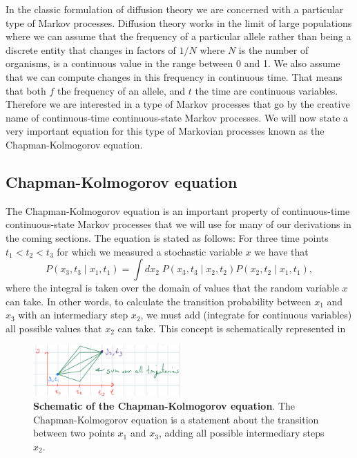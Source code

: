 In the classic formulation of diffusion theory we are concerned with a
particular type of Markov processes. Diffusion theory works in the limit of
large populations where we can assume that the frequency of a particular allele
rather than being a discrete entity that changes in factors of $1 / N$ where
$N$ is the number of organisms, is a continuous value in the range between 0
and 1. We also assume that we can compute changes in this frequency in
continuous time. That means that both $f$ the frequency of an allele, and $t$
the time are continuous variables. Therefore we are interested in a type of
Markov processes that go by the creative name of continuous-time
continuous-state Markov processes. We will now state a very important equation
for this type of Markovian processes known as the Chapman-Kolmogorov equation.

\subsection{Chapman-Kolmogorov equation} \label{sec_chapman_kolmogorov}

The Chapman-Kolmogorov equation is an important property of continuous-time
continuous-state Markov processes that we will use for many of our derivations
in the coming sections. The equation is stated as follows: For three time points
$t_1 < t_2 < t_3$ for which we measured a stochastic variable $x$ we have that
\begin{equation}
  P(x_3, t_3 \mid x_1, t_1) = \int dx_2\; P(x_3, t_3 \mid x_2, t_2)
                                          P(x_2, t_2 \mid x_1, t_1),
\end{equation}
where the integral is taken over the domain of values that the random variable
$x$ can take. In other words, to calculate the transition probability between
$x_1$ and $x_3$ with an intermediary step $x_2$, we must add (integrate for
continuous variables) all possible values that $x_2$ can take. This concept is
schematically represented in 

\begin{figure}[h!]
	\centering \includegraphics[width=0.5\textwidth]
  {./fig/chapter_prob/01_00003.png}
	\caption{\textbf{Schematic of the Chapman-Kolmogorov equation}. The
  Chapman-Kolmogorov equation is a statement about the transition between two
  points $x_1$ and $x_3$, adding all possible intermediary steps $x_2$.}
  \label{fig01_00003}
\end{figure}

